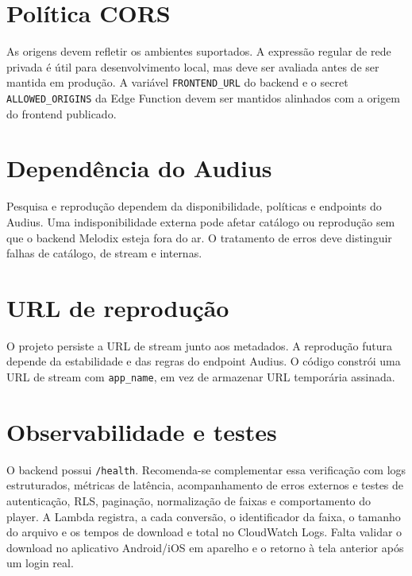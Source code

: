 \documentclass[12pt,a4paper,oneside]{report}
\begin{document}
\section{Política CORS}
As origens devem refletir os ambientes suportados. A expressão regular de rede privada é útil para desenvolvimento local, mas deve ser avaliada antes de ser mantida em produção. A variável \texttt{FRONTEND\_URL} do backend e o secret \texttt{ALLOWED\_ORIGINS} da Edge Function devem ser mantidos alinhados com a origem do frontend publicado.

\section{Dependência do Audius}
Pesquisa e reprodução dependem da disponibilidade, políticas e endpoints do Audius. Uma indisponibilidade externa pode afetar catálogo ou reprodução sem que o backend Melodix esteja fora do ar. O tratamento de erros deve distinguir falhas de catálogo, de stream e internas.

\section{URL de reprodução}
O projeto persiste a URL de stream junto aos metadados. A reprodução futura depende da estabilidade e das regras do endpoint Audius. O código constrói uma URL de stream com \texttt{app\_name}, em vez de armazenar URL temporária assinada.

\section{Observabilidade e testes}
O backend possui \texttt{/health}. Recomenda-se complementar essa verificação com logs estruturados, métricas de latência, acompanhamento de erros externos e testes de autenticação, RLS, paginação, normalização de faixas e comportamento do player. A Lambda registra, a cada conversão, o identificador da faixa, o tamanho do arquivo e os tempos de download e total no CloudWatch Logs. Falta validar o download no aplicativo Android/iOS em aparelho e o retorno à tela anterior após um login real.
\end{document}
